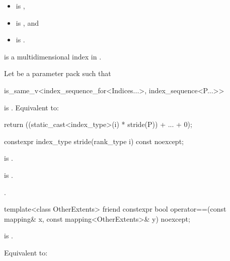 \begin{itemdescr}
\pnum
\constraints
\begin{itemize}
\item
{} is ,
\item
{} is , and
\item
{} is .
\end{itemize}

\pnum
\expects
{} is
a multidimensional index in .

\pnum
\effects
Let  be a parameter pack such that
\begin{codeblock}
is_same_v<index_sequence_for<Indices...>, index_sequence<P...>>
\end{codeblock}
is .
Equivalent to:
\begin{codeblock}
return ((static_cast<index_type>(i) * stride(P)) + ... + 0);
\end{codeblock}
\end{itemdescr}

%
\begin{itemdecl}
constexpr index_type stride(rank_type i) const noexcept;
\end{itemdecl}

\begin{itemdescr}
\pnum
\constraints
{} is .

\pnum
\expects
{} is .

\pnum
\returns
{}.
\end{itemdescr}

%
\begin{itemdecl}
template<class OtherExtents>
  friend constexpr bool operator==(const mapping& x, const mapping<OtherExtents>& y) noexcept;
\end{itemdecl}

\begin{itemdescr}
\pnum
\constraints
{} is .

\pnum
\effects
Equivalent to: 
\end{itemdescr}

